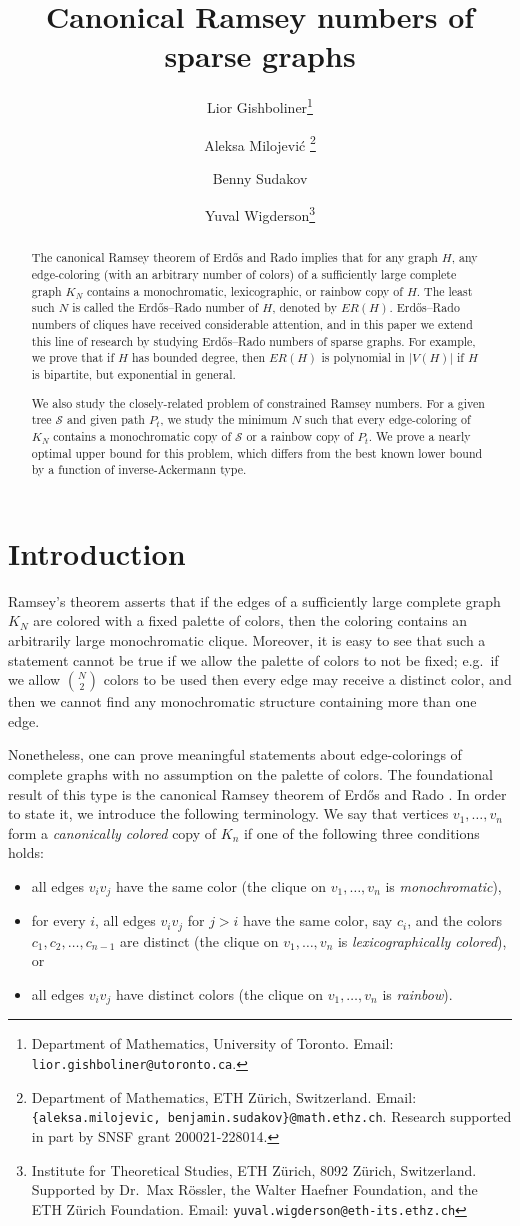 \documentclass[a4paper,11pt]{article}
\title{\vspace{-0.9cm}Canonical Ramsey numbers of sparse graphs}
\author{Lior Gishboliner\thanks{Department of Mathematics, University of Toronto. Email: {\tt lior.gishboliner@utoronto.ca}.} \and Aleksa Milojevi\'c \thanks{Department of Mathematics, ETH Z\"urich, Switzerland. Email: {\tt \{aleksa.milojevic, benjamin.sudakov\}@math.ethz.ch}. Research supported in part by SNSF grant 200021-228014.}\and Benny Sudakov \footnotemark[2]
\and Yuval Wigderson\thanks{Institute for Theoretical Studies, ETH Z\"urich, 8092 Z\"urich, Switzerland. 
   Supported by Dr.\ Max R\"{o}ssler, the Walter Haefner Foundation, and the ETH Z\"{u}rich Foundation. Email: {\tt{yuval.wigderson@eth-its.ethz.ch}}}}
\date{}
\theoremstyle{definition}
\def\cS{\mathcal{S}}
\newcommand{\ab}[1]{\lvert #1 \rvert}
\begin{document}
\maketitle
\begin{abstract}
    The canonical Ramsey theorem of Erd\H os and Rado implies that for any graph $H$, any edge-coloring (with an arbitrary number of colors) of a sufficiently large complete graph $K_N$ contains a monochromatic, lexicographic, or rainbow copy of $H$. The least such $N$ is called the Erd\H os--Rado number of $H$, denoted by $ER(H)$.  Erd\H os--Rado numbers of cliques have received considerable attention, and in this paper we extend this line of research by studying Erd\H os--Rado numbers of sparse graphs.
    For example, we prove that if $H$ has bounded degree, then $ER(H)$ is polynomial in $\ab{V(H)}$ if $H$ is bipartite, but exponential in general. 
    
    We also study the closely-related problem of constrained Ramsey numbers. For a given tree $\cS$ and given path $P_t$, we study the minimum $N$ such that every edge-coloring of $K_N$ contains a monochromatic copy of $\cS$ or a rainbow copy of $P_t$. We prove a nearly optimal upper bound for this problem, which differs from the best known lower bound by a function of inverse-Ackermann \nolinebreak type.
\end{abstract}

\section{Introduction}
Ramsey's theorem asserts that if the edges of a sufficiently large complete graph $K_N$ are colored with a fixed palette of colors, then the coloring contains an arbitrarily large monochromatic clique. Moreover, it is easy to see that such a statement cannot be true if we allow the palette of colors to not be fixed; e.g.\ if we allow $\binom N2$ colors to be used then every edge may receive a distinct color, and then we cannot find any monochromatic structure containing more than one edge.

Nonetheless, one {can} prove meaningful statements about edge-colorings of complete graphs with no assumption on the palette of colors. The foundational result of this type is the canonical Ramsey theorem of Erd\H os and Rado \cite{ER50}. In order to state it, we introduce the following terminology. We say that vertices $v_1, \dots, v_n$ form a {\em canonically colored} copy of $K_n$ if one of the following three conditions holds:
\begin{itemize}
    \item all edges $v_iv_j$ have the same color (the clique on $v_1, \dots, v_n$ is \emph{monochromatic}),
    \item for every $i$, all edges $v_iv_j$ for $j>i$ have the same color, say $c_i$, and the colors $c_1, c_2, \dots, c_{n-1}$ are distinct (the clique on $v_1, \dots, v_n$ is \emph{lexicographically colored}), or
    \item all edges $v_iv_j$ have distinct colors (the clique on $v_1, \dots, v_n$ is \emph{rainbow}).
\end{itemize}
\end{document}
